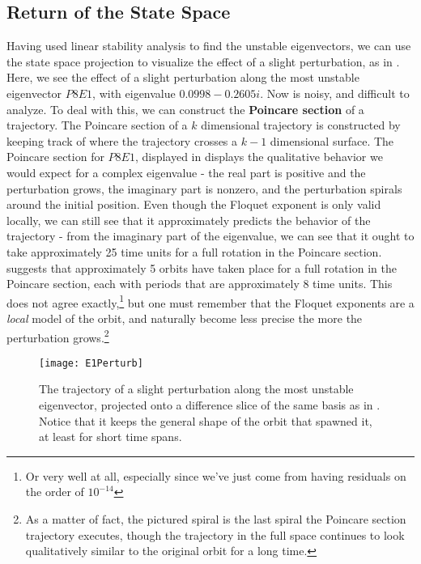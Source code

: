 \subsection{Return of the State Space}

Having used linear stability analysis to find the unstable eigenvectors, we can use the state space projection to visualize the effect of a slight perturbation, as  in . Here, we see the effect of a slight perturbation along the most unstable eigenvector $P8E1$, with eigenvalue $0.0998 - 0.2605 i$. Now  is noisy, and difficult to analyze. To deal with this, we can construct the {\bf Poincare section} of a trajectory. The Poincare section of a $k$ dimensional trajectory is constructed by keeping track of where the trajectory crosses a $k-1$ dimensional surface. The Poincare section for  $P8E1$, displayed in  displays the qualitative behavior we would expect for a complex eigenvalue - the real part is positive and the perturbation grows, the imaginary part is nonzero, and the perturbation spirals around the initial position. Even though the Floquet exponent is only valid locally, we can still see that it approximately predicts the behavior of the trajectory - from the imaginary part of the eigenvalue, we can see that it ought to take approximately 25 time units for a full rotation in the Poincare section.  suggests that approximately 5 orbits have taken place for a full rotation in the Poincare section, each with periods that are approximately 8 time units. This does not agree exactly,\footnote{Or very well at all, especially since we've just come from having residuals on the order of $10^{-14}$} but one must remember that the Floquet exponents are a \emph{local} model of the orbit, and naturally become less precise the more the perturbation grows.\footnote{As a matter of fact, the pictured spiral is the last spiral the Poincare section trajectory executes, though the trajectory in the full space continues to look qualitatively similar to the original orbit for a long time.}   


\begin{figure}[h!]
\centerline{\texttt{[image: E1Perturb]}}
\caption{The trajectory of a slight perturbation along the most unstable eigenvector, projected onto a difference slice of the same basis as in . Notice that it keeps the general shape of the orbit that spawned it, at least for short time spans.}\label{fig:p8E1}
\end{figure}


